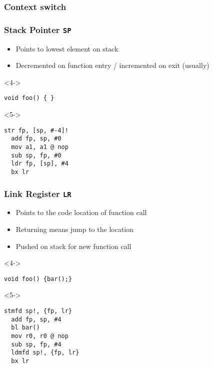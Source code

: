 \documentclass{beamer}
\begin{document}
\begin{frame}[fragile]
\frametitle{Context switch}
\begin{adjustbox}{max totalsize={.9\textwidth}{.9\textheight},center}

\end{adjustbox}

\end{frame}

\begin{frame}[fragile]
\frametitle{Stack Pointer \lstinline{SP}}
\begin{itemize}
\item<1-> Points to lowest element on stack
\item<2-> Decremented on function entry / incremented on exit (usually)
\end{itemize}

\begin{block}<4->{}
\begin{lstlisting}
void foo() { }
\end{lstlisting}
\end{block}

\begin{block}<5->{}
\begin{lstlisting}[language=ASM]
  str fp, [sp, #-4]!
  add fp, sp, #0
  mov a1, a1 @ nop
  sub sp, fp, #0
  ldr fp, [sp], #4
  bx lr
\end{lstlisting}
\end{block}

\end{frame}

\begin{frame}[fragile]
\frametitle{Link Register \lstinline{LR}}
\begin{itemize}
\item<1-> Points to the code location of function call
\item<2-> Returning means jump to the location
\item<3-> Pushed on stack for new function call
\end{itemize}

\begin{block}<4->{}
\begin{lstlisting}
void foo() {bar();}
\end{lstlisting}
\end{block}

\begin{block}<5->{}
\begin{lstlisting}[language=ASM]
  stmfd sp!, {fp, lr}
  add fp, sp, #4
  bl bar()
  mov r0, r0 @ nop
  sub sp, fp, #4
  ldmfd sp!, {fp, lr}
  bx lr
\end{lstlisting}
\end{block}

\end{frame}
\end{document}
